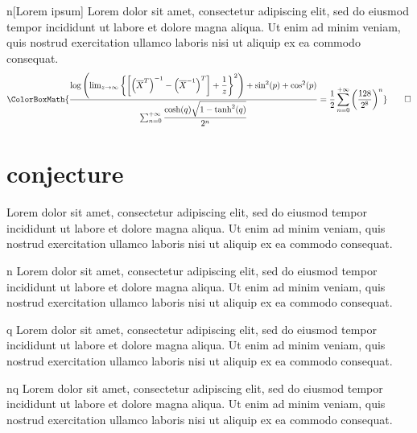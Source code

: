 \begin{remember}{n}[Lorem ipsum]
	Lorem dolor sit amet, consectetur adipiscing elit, sed do eiusmod tempor incididunt ut labore et dolore magna aliqua. Ut enim ad minim veniam, quis nostrud exercitation ullamco laboris nisi ut aliquip ex ea commodo consequat.
	\begin{equation*}
		\ColorBoxMath{\dfrac{\log\left(\lim_{z\to\infty}\left\{\left[\left(\overline{X}^{T}\right)^{-1}-\left(\overline{X}^{-1}\right)^T\right]+\dfrac{1}{z}\right\}^2\right)+\sin^2(p)+\cos^2(p)}{\sum_{n=0}^{+\infty}\dfrac{\cosh(q)\sqrt{1-\tanh^2(q)}}{2^n}}=\dfrac{1}{2}\sum_{n=0}^{+\infty}\left(\dfrac{128}{2^8}\right)^n}\qedhere
	\end{equation*}
\end{remember}

\newpage

\section{conjecture}

\begin{conjecture}{}
	Lorem dolor sit amet, consectetur adipiscing elit, sed do eiusmod tempor incididunt ut labore et dolore magna aliqua. Ut enim ad minim veniam, quis nostrud exercitation ullamco laboris nisi ut aliquip ex ea commodo consequat.
\end{conjecture}

\begin{conjecture}{n}
	Lorem dolor sit amet, consectetur adipiscing elit, sed do eiusmod tempor incididunt ut labore et dolore magna aliqua. Ut enim ad minim veniam, quis nostrud exercitation ullamco laboris nisi ut aliquip ex ea commodo consequat.
\end{conjecture}

\begin{conjecture}{q}
	Lorem dolor sit amet, consectetur adipiscing elit, sed do eiusmod tempor incididunt ut labore et dolore magna aliqua. Ut enim ad minim veniam, quis nostrud exercitation ullamco laboris nisi ut aliquip ex ea commodo consequat.
\end{conjecture}

\begin{conjecture}{nq}
	Lorem dolor sit amet, consectetur adipiscing elit, sed do eiusmod tempor incididunt ut labore et dolore magna aliqua. Ut enim ad minim veniam, quis nostrud exercitation ullamco laboris nisi ut aliquip ex ea commodo consequat.
\end{conjecture}

